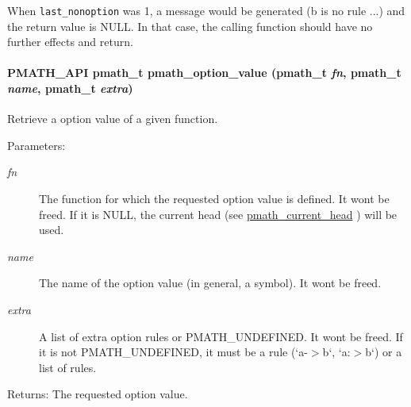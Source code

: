 When {\tt last\_\-nonoption} was 1, a message would be generated (b is no rule ...) and the return value is NULL. In that case, the calling function should have no further effects and return. \hypertarget{group__helpers_gc244ab0720278b396976728a39f8bde6}{
\paragraph[{pmath\_\-option\_\-value}]{\setlength{\rightskip}{0pt plus 5cm}PMATH\_\-API {\bf pmath\_\-t} pmath\_\-option\_\-value ({\bf pmath\_\-t} {\em fn}, \/  {\bf pmath\_\-t} {\em name}, \/  {\bf pmath\_\-t} {\em extra})}\hfill}
\label{group__helpers_gc244ab0720278b396976728a39f8bde6}


Retrieve a option value of a given function. 

\begin{Desc}
\item[Parameters:]
\begin{description}
\item[{\em fn}]The function for which the requested option value is defined. It wont be freed. If it is NULL, the current head (see \hyperlink{group__helpers_g70aa270956b6c8f8eb43431f9775ae88}{pmath\_\-current\_\-head} ) will be used. \item[{\em name}]The name of the option value (in general, a symbol). It wont be freed. \item[{\em extra}]A list of extra option rules or PMATH\_\-UNDEFINED. It wont be freed. If it is not PMATH\_\-UNDEFINED, it must be a rule (`a-$>$b`, `a:$>$b`) or a list of rules. \end{description}
\end{Desc}
\begin{Desc}
\item[Returns:]The requested option value. \end{Desc}
